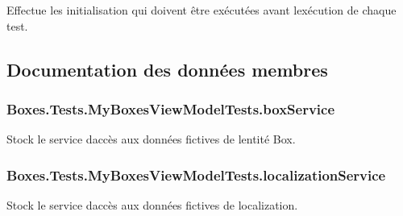 Effectue les initialisation qui doivent être exécutées avant l\textquotesingle{}exécution de chaque test. 



\subsection{Documentation des données membres}
\subsubsection[{\texorpdfstring{box\+Service}{boxService}}]{ Boxes.\+Tests.\+My\+Boxes\+View\+Model\+Tests.\+box\+Service\hspace{0.3cm}{\ttfamily [private]}}\hypertarget{class_boxes_1_1_tests_1_1_my_boxes_view_model_tests_a443c4249c89639c31c192682af92f0ba}{}\label{class_boxes_1_1_tests_1_1_my_boxes_view_model_tests_a443c4249c89639c31c192682af92f0ba}


Stock le service d\textquotesingle{}accès aux données fictives de l\textquotesingle{}entité Box. 

\subsubsection[{\texorpdfstring{localization\+Service}{localizationService}}]{ Boxes.\+Tests.\+My\+Boxes\+View\+Model\+Tests.\+localization\+Service\hspace{0.3cm}{\ttfamily [private]}}\hypertarget{class_boxes_1_1_tests_1_1_my_boxes_view_model_tests_ab502aba1a3896e8d7becc071c0a1f509}{}\label{class_boxes_1_1_tests_1_1_my_boxes_view_model_tests_ab502aba1a3896e8d7becc071c0a1f509}


Stock le service d\textquotesingle{}accès aux données fictives de localization. 

